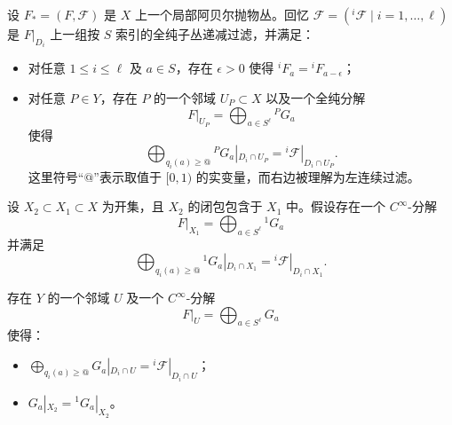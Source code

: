 设 \(F_*=(F,\mathcal F)\) 是 \(X\) 上一个局部阿贝尔抛物丛。回忆 \(\mathcal F=({}^i\mathcal F\mid i=1,\dots,\ell)\) 是 \(F|_{D_i}\) 上一组按 \(S\) 索引的全纯子丛递减过滤，并满足：
\begin{itemize}
\item 对任意 \(1\le i\le \ell\) 及 \(a\in S\)，存在 \(\epsilon>0\) 使得 \({}^iF_a={}^iF_{a-\epsilon}\)；
\item 对任意 \(P\in Y\)，存在 \(P\) 的一个邻域 \(U_P\subset X\) 以及一个全纯分解
\[
F|_{U_P}=\bigoplus_{a\in S^\ell} {}^P G_a
\]
使得
\[
\bigoplus_{q_i(a)\ge @} {}^P G_a|_{D_i\cap U_P}
=
{}^i\mathcal F|_{D_i\cap U_P}.
\]
这里符号“\(@\)”表示取值于 \([0,1)\) 的实变量，而右边被理解为左连续过滤。
\end{itemize}

设 \(X_2\subset X_1\subset X\) 为开集，且 \(X_2\) 的闭包包含于 \(X_1\) 中。假设存在一个 \(C^\infty\)-分解
\[
F|_{X_1}=\bigoplus_{a\in S^\ell} {}^1G_a
\]
并满足
\[
\bigoplus_{q_i(a)\ge @} {}^1G_a|_{D_i\cap X_1}
=
{}^i\mathcal F|_{D_i\cap X_1}.
\]

\begin{proposition}
存在 \(Y\) 的一个邻域 \(U\) 及一个 \(C^\infty\)-分解
\[
F|_U=\bigoplus_{a\in S^\ell} G_a
\]
使得：
\begin{itemize}
\item \(\bigoplus_{q_i(a)\ge @}G_a|_{D_i\cap U}={}^i\mathcal F|_{D_i\cap U}\)；
\item \(G_a|_{X_2}={}^1G_a|_{X_2}\)。
\end{itemize}
\end{proposition}

